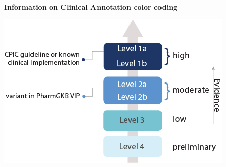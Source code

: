 \documentclass{resume} %
\begin{document}
\textbf{Information on Clinical Annotation color coding}

\includegraphics[scale=0.6]{levelsOfEvidence.png}
\end{document}
